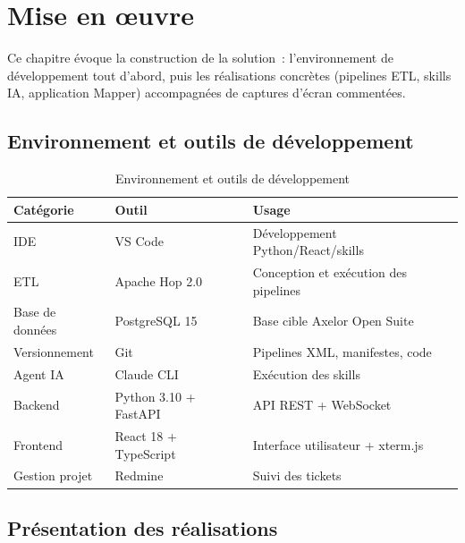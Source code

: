 \chapter{Mise en œuvre}
\label{chap:implementation}

Ce chapitre évoque la construction de la solution~: l'environnement de développement tout d'abord, puis les réalisations concrètes (pipelines ETL, skills IA, application Mapper) accompagnées de captures d'écran commentées.

\section{Environnement et outils de développement}

\begin{table}[H]
  \centering
  \renewcommand{\arraystretch}{1.4}
  \begin{tabular}{p{4cm} p{4cm} p{5.5cm}}
    \toprule
    \rowcolor{gray!20}
    \textbf{Catégorie} & \textbf{Outil} & \textbf{Usage} \\
    \midrule
    \rowcolor{gray!5}
    IDE             & VS Code               & Développement Python/React/skills \\
    ETL             & Apache Hop 2.0        & Conception et exécution des pipelines \\
    \rowcolor{gray!5}
    Base de données & PostgreSQL 15         & Base cible Axelor Open Suite \\
    Versionnement   & Git                   & Pipelines XML, manifestes, code \\
    \rowcolor{gray!5}
    Agent IA        & Claude CLI            & Exécution des skills \\
    Backend         & Python 3.10 + FastAPI & API REST + WebSocket \\
    \rowcolor{gray!5}
    Frontend        & React 18 + TypeScript & Interface utilisateur + xterm.js \\
    Gestion projet  & Redmine               & Suivi des tickets \\
    \bottomrule
  \end{tabular}
  \caption{Environnement et outils de développement}
  \label{tab:outils-dev}
\end{table}

\section{Présentation des réalisations}


